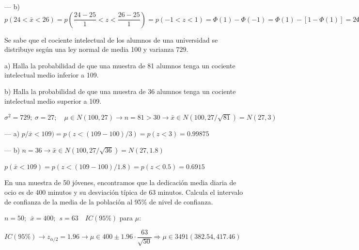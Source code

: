 --- b) $p(24<\bar x<26)=p \left( \dfrac{24-25}{1}<z<\dfrac{26-25}{1} \right) =p(-1<z<1)=\Phi(1)-\Phi(-1)=\Phi(1)-[1-\Phi(1)]=2\Phi(1)-1=2(0.8413)-1=0.6826$



\vspace{4mm}
\begin{ejemplo}
\begin{ejer}
	Se sabe que el cociente intelectual de los alumnos de una universidad se distribuye según una ley normal de media 100 y varianza 729.

a) Halla la probabilidad de que una muestra de 81 alumnos tenga un cociente intelectual medio inferior a 109.

b) Halla la probabilidad de que una muestra de 36 alumnos tenga un cociente intelectual medio superior a 109.
\end{ejer}	
\end{ejemplo}
$\sigma^2=729;\ \sigma=27;\quad  \mu \in N(100,27) \to n=81>30 \to \bar x \in N(100,27/\sqrt{81})=N(27,3)$

--- a) $p/\bar x<109)=p(z<(109-100)/3)=p(z<3)=0.99875$

--- b) $n=36 \to \bar x \in N(100,27/\sqrt{36})=N(27,1.8)$

$p(\bar x<109)=p(z<(109-100)/1.8)=p(z<0.5)=0.6915$



\vspace{4mm}
\begin{ejemplo}
\begin{ejer}
	En una muestra de 50 jóvenes, encontramos que la dedicación media diaria de ocio es de 400 minutos y su desviación típica de 63 minutos. Calcula el intervalo de confianza de la media de la población al 95\% de nivel de confianza.
\end{ejer}	
\end{ejemplo}
$n=50;\ \ \bar x=400;\ \ s=63 \quad IC(95\%) $ para $\mu$:

$IC(95\%)\to z_{\alpha/2}=1.96 \to \mu \in 400\pm 1.96 \cdot \dfrac{63}{\sqrt{50}} \Rightarrow \mu \in 3491
(382.54,417.46)$





